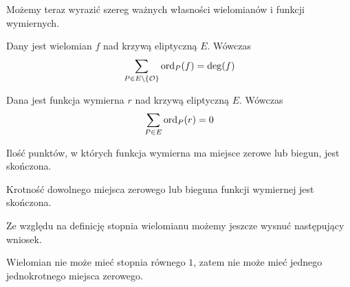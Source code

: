 Możemy teraz wyrazić szereg ważnych własności
wielomianów i funkcji wymiernych.

\begin{theorem}
Dany jest wielomian $f$ nad krzywą eliptyczną $E$.
Wówczas
\begin{equation*}
\sum_{P \in E\setminus \{\mathcal{O}\}} \operatorname{ord}_P(f) = \deg(f)
\end{equation*}
\end{theorem}

\begin{corollary}\label{function_order_sum_zero_corollary}
Dana jest funkcja wymierna $r$ nad krzywą eliptyczną $E$. Wówczas
\begin{equation*}
\sum_{P \in E} \operatorname{ord}_P(r) = 0
\end{equation*}
\end{corollary}

\begin{corollary}
Ilość punktów, w których funkcja wymierna ma miejsce zerowe lub biegun,
jest skończona.
\end{corollary}

\begin{corollary}
Krotność dowolnego miejsca zerowego lub bieguna funkcji wymiernej
jest skończona.
\end{corollary}

Ze względu na definicję stopnia wielomianu
możemy jeszcze wysnuć następujący wniosek.

\begin{corollary}\label{poly_no_single_zero_corollary}
Wielomian nie może mieć stopnia równego $1$,
zatem nie może mieć jednego jednokrotnego miejsca zerowego.
\end{corollary}
